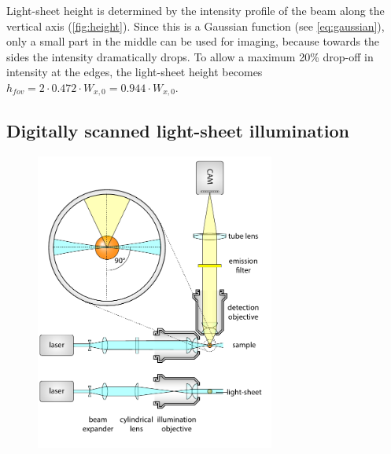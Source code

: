 
    Light-sheet height is determined by the intensity profile of the beam along the vertical axis (\autoref{fig:height}). Since this is a Gaussian function (see \autoref{eq:gaussian}), only a small part in the middle can be used for imaging, because towards the sides the intensity dramatically drops. To allow a maximum 20\% drop-off in intensity at the edges, the light-sheet height becomes $h_{fov}=2\cdot 0.472\cdot W_{x,0} = 0.944 \cdot W_{x,0}$.
    

  \subsection{Digitally scanned light-sheet illumination}

    \begin{figure}[bt!]
      \centering
      \includegraphics[page=2,width=0.7\textwidth]{spim_cyl}
        \label{fig:dslm}
    \end{figure}

